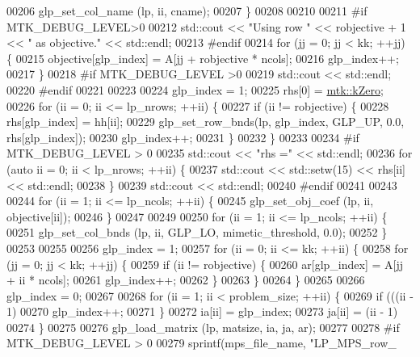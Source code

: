 \begin{DoxyCode}
{{00206     glp\_set\_col\_name (lp, ii, cname);
00207   \}
00208 
00210 
00211 \textcolor{preprocessor}{  #if MTK\_DEBUG\_LEVEL>0}
00212   std::cout << \textcolor{stringliteral}{"Using row "} << robjective + 1 << \textcolor{stringliteral}{" as objective."} << std::endl;
00213 \textcolor{preprocessor}{  #endif}
00214   \textcolor{keywordflow}{for} (jj = 0; jj < kk; ++jj) \{
00215     objective[glp\_index] = A[jj + robjective * ncols];
00216     glp\_index++;
00217   \}
00218 \textcolor{preprocessor}{  #if MTK\_DEBUG\_LEVEL >0}
00219   std::cout << std::endl;
00220 \textcolor{preprocessor}{  #endif}
00221 
00223 
00224   glp\_index = 1;
00225   rhs[0] = \hyperlink{group__c01-roots_ga59a451a5fae30d59649bcda274fea271}{mtk::kZero};
00226   \textcolor{keywordflow}{for} (ii = 0; ii <= lp\_nrows; ++ii) \{
00227     \textcolor{keywordflow}{if} (ii != robjective) \{
00228       rhs[glp\_index] = hh[ii];
00229       glp\_set\_row\_bnds(lp, glp\_index, GLP\_UP, 0.0, rhs[glp\_index]);
00230       glp\_index++;
00231     \}
00232   \}
00233 
00234 \textcolor{preprocessor}{  #if MTK\_DEBUG\_LEVEL > 0}
00235   std::cout << \textcolor{stringliteral}{"rhs ="} << std::endl;
00236   \textcolor{keywordflow}{for} (\textcolor{keyword}{auto} ii = 0; ii < lp\_nrows; ++ii) \{
00237     std::cout << std::setw(15) << rhs[ii] << std::endl;
00238   \}
00239   std::cout << std::endl;
00240 \textcolor{preprocessor}{  #endif}
00241 
00243 
00244   \textcolor{keywordflow}{for} (ii = 1; ii <= lp\_ncols; ++ii) \{
00245     glp\_set\_obj\_coef (lp, ii, objective[ii]);
00246   \}
00247 
00249 
00250   \textcolor{keywordflow}{for} (ii = 1; ii <= lp\_ncols; ++ii) \{
00251     glp\_set\_col\_bnds (lp, ii, GLP\_LO, mimetic\_threshold, 0.0);
00252   \}
00253 
00255 
00256   glp\_index = 1;
00257   \textcolor{keywordflow}{for} (ii = 0; ii <= kk; ++ii) \{
00258     \textcolor{keywordflow}{for} (jj = 0; jj < kk; ++jj) \{
00259       \textcolor{keywordflow}{if} (ii != robjective) \{
00260         ar[glp\_index] = A[jj + ii * ncols];
00261         glp\_index++;
00262       \}
00263     \}
00264   \}
00265 
00266   glp\_index = 0;
00267 
00268   \textcolor{keywordflow}{for} (ii = 1; ii < problem\_size; ++ii) \{
00269     \textcolor{keywordflow}{if} (((ii - 1) %
00270       glp\_index++;
00271     \}
00272     ia[ii] = glp\_index;
00273     ja[ii] = (ii - 1) %
00274   \}
00275 
00276   glp\_load\_matrix (lp, matsize, ia, ja, ar);
00277 
00278 \textcolor{preprocessor}{  #if MTK\_DEBUG\_LEVEL > 0}
00279   sprintf(mps\_file\_name, \textcolor{stringliteral}{"LP\_MPS\_row\_%
}}}
\end{DoxyCode}
